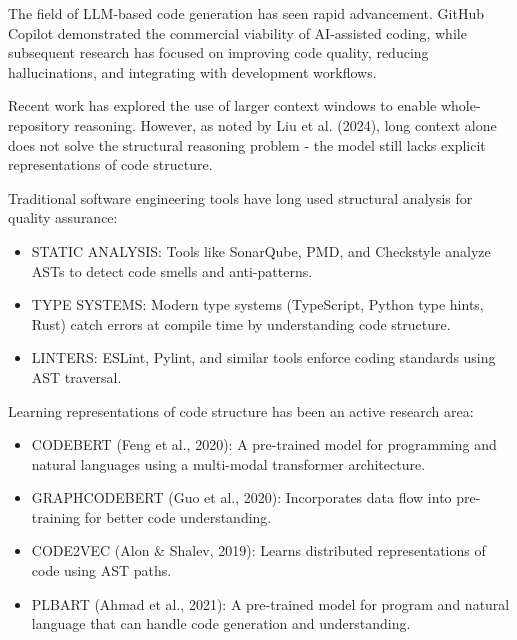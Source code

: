 

The field of LLM-based code generation has seen rapid advancement. GitHub Copilot demonstrated the commercial viability of AI-assisted coding, while subsequent research has focused on improving code quality, reducing hallucinations, and integrating with development workflows.

Recent work has explored the use of larger context windows to enable whole-repository reasoning. However, as noted by Liu et al. (2024), long context alone does not solve the structural reasoning problem - the model still lacks explicit representations of code structure.


Traditional software engineering tools have long used structural analysis for quality assurance:

\begin{itemize}
    \item STATIC ANALYSIS: Tools like SonarQube, PMD, and Checkstyle analyze ASTs to detect code smells and anti-patterns.
    \item TYPE SYSTEMS: Modern type systems (TypeScript, Python type hints, Rust) catch errors at compile time by understanding code structure.
    \item LINTERS: ESLint, Pylint, and similar tools enforce coding standards using AST traversal.
\end{itemize}


Learning representations of code structure has been an active research area:

\begin{itemize}
    \item CODEBERT (Feng et al., 2020): A pre-trained model for programming and natural languages using a multi-modal transformer architecture.
    \item GRAPHCODEBERT (Guo et al., 2020): Incorporates data flow into pre-training for better code understanding.
    \item CODE2VEC (Alon & Shalev, 2019): Learns distributed representations of code using AST paths.
    \item PLBART (Ahmad et al., 2021): A pre-trained model for program and natural language that can handle code generation and understanding.
\end{itemize}

